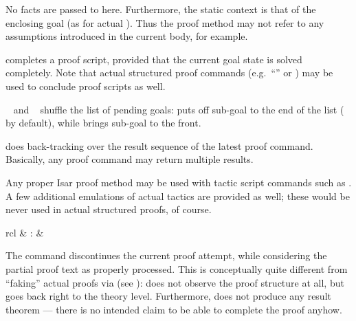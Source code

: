 \begin{isabellebody}
\begin{isamarkuptext}
\begin{descr}
  No facts are passed to \mbox{} here.  Furthermore, the static
  context is that of the enclosing goal (as for actual \mbox{}).  Thus the proof method may not refer to any assumptions
  introduced in the current body, for example.
  
  \item [\mbox{\isa{\isacommand{done}}}] completes a proof script, provided that
  the current goal state is solved completely.  Note that actual
  structured proof commands (e.g.\ ``\mbox{\isa{\isacommand{{\isachardot}}}}'' or \mbox{}) may be used to conclude proof scripts as well.

  \item [\mbox{\isa{\isacommand{defer}}}~\isa{n} and \mbox{\isa{\isacommand{prefer}}}~\isa{n}] shuffle the list of pending goals: \mbox{} puts off
  sub-goal  to the end of the list ( by
  default), while \mbox{} brings sub-goal  to the
  front.
  
  \item [\mbox{\isa{\isacommand{back}}}] does back-tracking over the result
  sequence of the latest proof command.  Basically, any proof command
  may return multiple results.
  
  \end{descr}

  Any proper Isar proof method may be used with tactic script commands
  such as \mbox{}.  A few additional emulations of actual
  tactics are provided as well; these would be never used in actual
  structured proofs, of course.%
\end{isamarkuptext}%
\isamarkuptrue%
%
\isamarkuptrue%
%
\begin{isamarkuptext}%
\begin{matharray}{rcl}
    \mbox{} & : &  \\
  \end{matharray}

  The \mbox{} command discontinues the current proof
  attempt, while considering the partial proof text as properly
  processed.  This is conceptually quite different from ``faking''
  actual proofs via \mbox{} (see
  ): \mbox{} does not observe the
  proof structure at all, but goes back right to the theory level.
  Furthermore, \mbox{} does not produce any result theorem
  --- there is no intended claim to be able to complete the proof
  anyhow.


\end{isamarkuptext}
\end{isabellebody}
